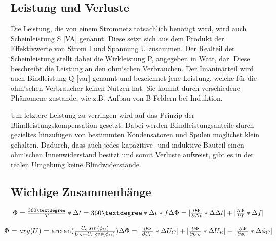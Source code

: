 \documentclass[12pt,a4paper,twoside]{article}
\begin{document}
\subsection{Leistung und Verluste}

Die Leistung, die von einem Stromnetz tatsächlich benötigt wird, wird auch Scheinleistung S [VA] genannt. Diese setzt sich aus dem Produkt der Effektivwerte von Strom I und Spannung U zusammen.
Der Realteil der Scheinleistung stellt dabei die Wirkleistung P, angegeben in Watt, dar. Diese beschreibt die Leistung an den ohm`schen Verbrauchen. Der Imaninärteil wird auch Bindleistung Q [var] genannt und bezeichnet jene Leistung, welche für die ohm`schen Verbraucher keinen Nutzen hat.
Sie kommt durch verschiedene Phänomene zustande, wie z.B. Aufbau von B-Feldern bei Induktion. \newline

\noindent
Um letztere Leistung zu verringen wird auf das Prinzip der Blindleistungskompensation gesetzt. Dabei werden Blindleistungsanteile durch gezieltes hinzufügen von bestimmten Kondensatoren und Spulen möglichst klein gehalten. Dadurch, dass auch jedes kapazitive- und induktive Bauteil einen ohm`schen Innenwiderstand besitzt und somit Verluste aufweist, gibt es in der realen Umgebung keine Blindwiderstände. 



 \subsection{Wichtige Zusammenhänge}

 \begin{equation}
    \label{eq:Phasenversatz}
    \centerline{$\Phi = \frac{360°}{T}*\Delta t = 360° * \Delta t * f$ \\ $\Delta \Phi = \vert \frac{\partial \Phi}{\partial \Delta t} * \Delta \Delta t \vert + \vert \frac{\partial \Phi}{\partial f} * \Delta f \vert $}
\end{equation}

\begin{equation}
    \label{eq:Phasenversatz_Kreise}
    \centerline{$\Phi $ = $arg(U)$ = $\arctan(\frac{U_{C}sin(\phi_C)}{U_R + U_{C}cos(\phi_C)}$) \\ $\Delta \Phi = \vert \frac{\partial \Phi}{\partial U_{C}} * \Delta U_{C} \vert + \vert \frac{\partial \Phi}{\partial U_R} * \Delta U_R \vert + \vert \frac{\partial \Phi}{\partial \phi_C} * \Delta \phi_C \vert$}
\end{equation}
\end{document}
